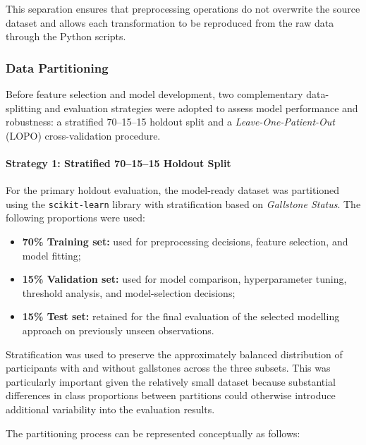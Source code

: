 This separation ensures that preprocessing operations do not overwrite the
source dataset and allows each transformation to be reproduced from the raw
data through the Python scripts.


\subsubsection{Data Partitioning}
\label{subsubsec:data-partitioning}
Before feature selection and model development, two complementary data-splitting
and evaluation strategies were adopted to assess model performance and
robustness: a stratified 70--15--15 holdout split and a
\textit{Leave-One-Patient-Out} (LOPO) cross-validation procedure.

\paragraph{Strategy 1: Stratified 70--15--15 Holdout Split}

For the primary holdout evaluation, the model-ready dataset was partitioned
using the \texttt{scikit-learn} library with stratification based on
\textit{Gallstone Status}. The following proportions were used:

\begin{itemize}

    \item \textbf{70\% Training set:} used for preprocessing decisions,
          feature selection, and model fitting;

    \item \textbf{15\% Validation set:} used for model comparison,
          hyperparameter tuning, threshold analysis, and model-selection
          decisions;

    \item \textbf{15\% Test set:} retained for the final evaluation of the
          selected modelling approach on previously unseen observations.

\end{itemize}

Stratification was used to preserve the approximately balanced distribution of
participants with and without gallstones across the three subsets. This was
particularly important given the relatively small dataset because substantial
differences in class proportions between partitions could otherwise introduce
additional variability into the evaluation results.

The partitioning process can be represented conceptually as follows:

